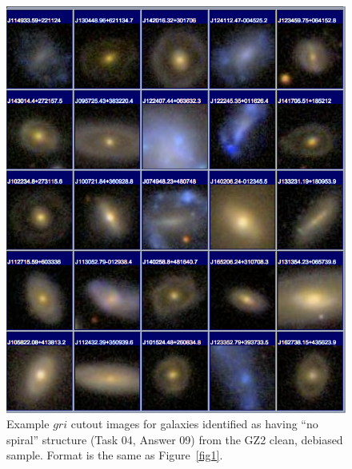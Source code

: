 \documentclass[useAMS,usenatbib]{mn2e}
\begin{document}
\newpage
\clearpage
\begin{figure}
\includegraphics[angle=0,width=7.0in]{figures/gallery/nospiral.png}
\caption{Example $gri$ cutout images for galaxies identified as having ``no spiral'' structure (Task 04, Answer 09) from the GZ2 clean, debiased sample. Format is the same as Figure~\ref{fig1}.}
\end{figure}
\end{document}
